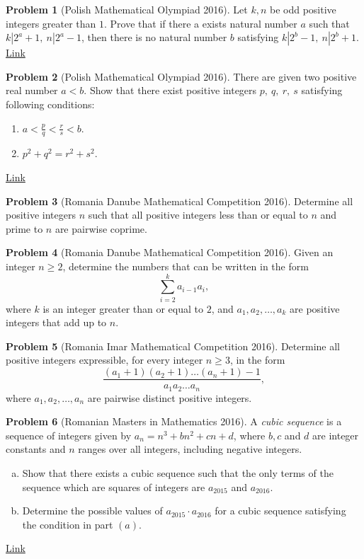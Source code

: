 \documentclass[]{article}
\theoremstyle{definition}
\newtheorem{problem}{Problem}
\begin{document}
\begin{problem}[Polish Mathematical Olympiad 2016]
	Let $k, n$ be odd positive integers greater than $1$. Prove that if there a exists natural number $a$ such that $k|2^a+1, \ n|2^a-1$, then there is no natural number $b$ satisfying $k|2^b-1, \ n|2^b+1$. \hfill \href{http://artofproblemsolving.com/community/c6h1224675p6149643}{Link}
\end{problem}



\begin{problem}[Polish Mathematical Olympiad 2016]
	There are given two positive real number $a<b$. Show that there exist positive integers $p, \ q, \ r, \ s$ satisfying following conditions:
		\begin{enumerate}
			\item $a< \frac{p}{q} < \frac{r}{s} < b$.
			\item $p^2+q^2=r^2+s^2$.
		\end{enumerate}
	\flushright \href{http://artofproblemsolving.com/community/c6h1224679p6149678}{Link}
\end{problem}


\begin{problem}[Romania Danube Mathematical Competition 2016]
	Determine all positive integers $n$ such that all positive integers less than or equal to $n$ and prime to $n$ are pairwise coprime.
\end{problem}


\begin{problem}[Romania Danube Mathematical Competition 2016]
	Given an integer $n \geq 2$, determine the numbers that can be written in
	the form $$ \sum_{i=2}^{k} a_{i-1}a_i,$$ where $k$ is an integer greater than or equal to $2$, and $a_1,a_2,\dots, a_k$ are positive integers that add up to $n$.
\end{problem}


\begin{problem}[Romania Imar Mathematical Competition 2016]
	Determine all positive integers expressible, for every integer $n \geq 3$,
	in the form $$\frac{(a_1 + 1)(a_2 + 1) \dots (a_n + 1) - 1}{a_1a_2\dots a_n},$$ where $a_1, a_2, \dots, a_n$ are pairwise distinct positive integers.
\end{problem}



\begin{problem}[Romanian Masters in Mathematics 2016]
	A \textit{cubic sequence} is a sequence of integers given by $a_n =n^3 + bn^2 + cn + d$, where $b, c$ and $d$ are integer constants and $n$ ranges over all integers, including negative integers.
	\begin{enumerate}[(a)]
		\item Show that there exists a cubic sequence such that the only terms
		of the sequence which are squares of integers are $a_{2015}$ and $a_{2016}$.
		\item Determine the possible values of $a_{2015} \cdot a_{2016}$ for a cubic sequence
		satisfying the condition in part $(a)$.
	\end{enumerate}
	\flushright \href{http://artofproblemsolving.com/community/c6h1204358p5938852}{Link}
\end{problem}
\end{document}
